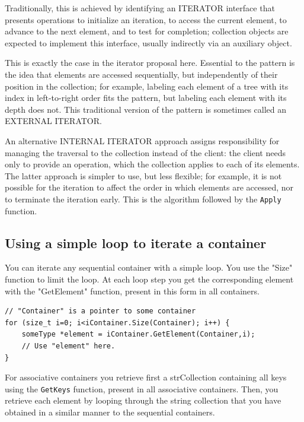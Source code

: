 \documentclass[12pt,a4paper]{memoir} %
\begin{document}
Traditionally, this is achieved by identifying an ITERATOR interface that presents operations to initialize an iteration, to access the current element, to advance to the next element, and to test for completion; collection objects are expected to implement this interface, usually indirectly via an auxiliary object. 

This is exactly the case in the iterator proposal here. Essential to the pattern is the idea that elements are accessed sequentially, but independently of their position in the collection; for example, labeling each element of a tree with its index in left-to-right order fits the pattern, but labeling each element with its depth does not. This traditional version of the pattern is sometimes called an EXTERNAL ITERATOR. 

An alternative INTERNAL ITERATOR approach assigns responsibility for managing the traversal to the collection instead of the client: the client needs only to provide an operation, which the collection applies to each of its elements. The latter approach is simpler to use, but less flexible; for example, it is not possible for the iteration to affect the order in which elements are accessed, nor to terminate the iteration early. This is the algorithm followed by the \verb,Apply, function.

\subsection{Using a simple loop to iterate a container}

You can iterate any sequential container with a simple loop. You use the "Size" function to limit the loop. At each loop step you get the corresponding 
element with the "GetElement" function, present in this form in all containers.
\begin{verbatim}
// "Container" is a pointer to some container
for (size_t i=0; i<iContainer.Size(Container); i++) {
    someType *element = iContainer.GetElement(Container,i);
    // Use "element" here.
}
\end{verbatim}
For associative containers you retrieve first a strCollection containing all keys using the \texttt{GetKeys} function, present in all associative 
containers. Then, you retrieve each element by looping through the string collection that you have obtained in a similar manner to the sequential 
containers. 
\end{document}
